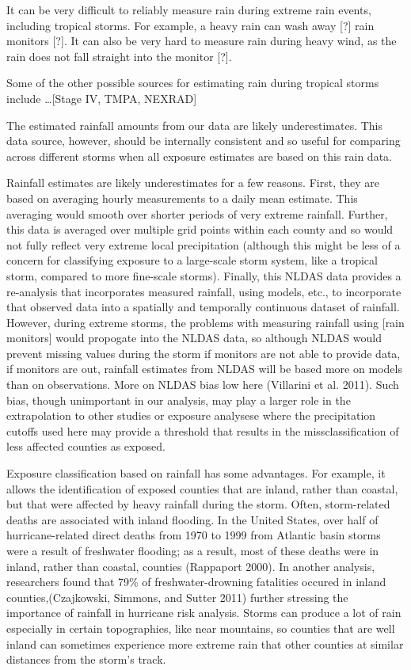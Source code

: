 \documentclass[]{elsarticle} %
\begin{document}
It can be very difficult to reliably measure rain during extreme rain
events, including tropical storms. For example, a heavy rain can wash
away {[}?{]} rain monitors {[}?{]}. It can also be very hard to measure
rain during heavy wind, as the rain does not fall straight into the
monitor {[}?{]}.

Some of the other possible sources for estimating rain during tropical
storms include \ldots{}{[}Stage IV, TMPA, NEXRAD{]}

The estimated rainfall amounts from our data are likely underestimates.
This data source, however, should be internally consistent and so useful
for comparing across different storms when all exposure estimates are
based on this rain data.

Rainfall estimates are likely underestimates for a few reasons. First,
they are based on averaging hourly measurements to a daily mean
estimate. This averaging would smooth over shorter periods of very
extreme rainfall. Further, this data is averaged over multiple grid
points within each county and so would not fully reflect very extreme
local precipitation (although this might be less of a concern for
classifying exposure to a large-scale storm system, like a tropical
storm, compared to more fine-scale storms). Finally, this NLDAS data
provides a re-analysis that incorporates measured rainfall, using
models, etc., to incorporate that observed data into a spatially and
temporally continuous dataset of rainfall. However, during extreme
storms, the problems with measuring rainfall using {[}rain monitors{]}
would propogate into the NLDAS data, so although NLDAS would prevent
missing values during the storm if monitors are not able to provide
data, if monitors are out, rainfall estimates from NLDAS will be based
more on models than on observations. More on NLDAS bias low here
(Villarini et al. 2011). Such bias, though unimportant in our analysis,
may play a larger role in the extrapolation to other studies or exposure
analysese where the precipitation cutoffs used here may provide a
threshold that results in the missclassification of less affected
counties as exposed.

Exposure classification based on rainfall has some advantages. For
example, it allows the identification of exposed counties that are
inland, rather than coastal, but that were affected by heavy rainfall
during the storm. Often, storm-related deaths are associated with inland
flooding. In the United States, over half of hurricane-related direct
deaths from 1970 to 1999 from Atlantic basin storms were a result of
freshwater flooding; as a result, most of these deaths were in inland,
rather than coastal, counties (Rappaport 2000). In another analysis,
researchers found that 79\% of freshwater-drowning fatalities occured in
inland counties,(Czajkowski, Simmons, and Sutter 2011) further stressing
the importance of rainfall in hurricane risk analysis. Storms can
produce a lot of rain especially in certain topographies, like near
mountains, so counties that are well inland can sometimes experience
more extreme rain that other counties at similar distances from the
storm's track.
\end{document}
